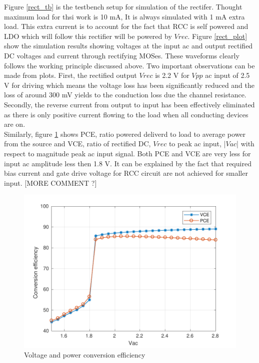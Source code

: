 \documentclass[12pt,a4paper,UKenglish]{article}
\begin{document}
Figure \ref{rect_tb} is the testbench setup for simulation of the rectifer. Thought maximum load for thsi work is 10 mA, 
It is always simulated with 1 mA extra load. This extra current is to 
account for the fact that RCC is self powered and LDO which will follow this rectifier will be powered by $Vrec$. Figure \ref{rect_plot} show the simulation results showing voltages at the input ac and output rectified DC 
voltages and current through rectifying MOSes. These  
waveforms clearly follows the working principle discussed above. Two important observations can be made from 
plots. First, the rectified output $Vrec$ is 2.2 V for $Vpp$ ac input of 2.5 V for driving which means the 
voltage loss has been significantly reduced and the loss of around 300 mV yields to the conduction loss due 
the channel resistance. Secondly, the reverse current from output to input has been effectively eliminated as 
there is only positive current flowing to the load when all conducting devices 
are on.  \\

Similarly, figure  \ref{rect_ce} shows PCE, ratio powered deliverd to load to average power from the source and 
VCE, ratio of rectified DC, $Vrec$ to peak ac input, |$Vac$| with respect to magnitude peak ac input signal. Both 
PCE and VCE are very less for input ac amplitude less then 1.8 V. It can be explained by the fact that required 
bias current and gate drive voltage for RCC circuit are not achieved for smaller input. [MORE COMMENT ?]

\begin{figure}[htbp] %
   \centering
   \includegraphics[width=\textwidth]{img/rectifier_ce.pdf} 
   \caption{Voltage and power conversion efficiency}
   \label{rect_ce}
\end{figure}
\end{document}
